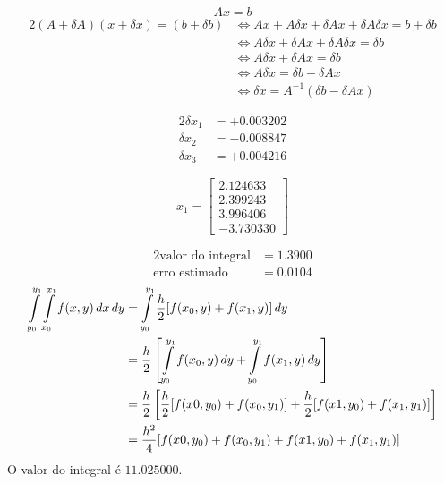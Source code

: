 \setcounter{chapter}{16}

\begin{equation*}
	Ax=b
\end{equation*}
\begin{alignat*}{2}
	(A+\delta A)(x+\delta x) = (b+\delta b)
	&\iff Ax+A\delta x + \delta A x + \delta A \delta x = b + \delta b \\
	&\iff A\delta x + \delta A x + \delta A \delta x = \delta b \\
	&\iff A\delta x + \delta A x = \delta b \\
	&\iff A\delta x = \delta b - \delta A x \\
	&\iff \delta x = A^{-1}(\delta b - \delta A x)
\end{alignat*}

\begin{alignat*}{2}
		\delta x_1 &= +0.003202\\
		\delta x_2 &= -0.008847\\
		\delta x_3 &= +0.004216
\end{alignat*}

%
\begin{equation*}
	x_1 =
	\begin{bmatrix}
		2.124633 \\
		2.399243 \\
		3.996406 \\
		-3.730330
	\end{bmatrix}
\end{equation*}

%
\begin{alignat*}{2}
	\text{valor do integral} &= 1.3900\\
	\text{erro estimado}     &= 0.0104
\end{alignat*}
\begin{alignat*}{2}
	\int\displaylimits_{y_0}^{y_1}{\int\displaylimits_{x_0}^{x_1}{f(x,y)\,dx}\,dy}
	&= \int\displaylimits_{y_0}^{y_1}{\frac{h}{2}[f(x_0,y)+f(x_1,y)]\,dy}\\
	&= \frac{h}{2}\left[\int\displaylimits_{y_0}^{y_1}{f(x_0,y)\,dy}+\int\displaylimits_{y_0}^{y_1}{f(x_1,y)\,dy}\right]\\
	&= \frac{h}{2}\left[\frac{h}{2}[f(x0,y_0)+f(x_0,y_1)]+\frac{h}{2}[f(x1,y_0)+f(x_1,y_1)]\right]\\
	&= \frac{h^2}{4}[f(x0,y_0)+f(x_0,y_1)+f(x1,y_0)+f(x_1,y_1)]
\end{alignat*}
%
O valor do integral é $11.025000$.


